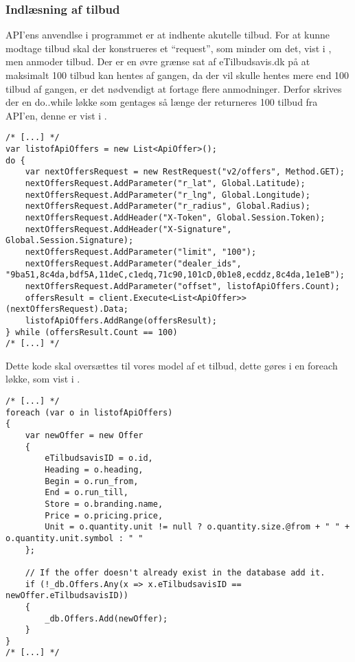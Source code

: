 \subsubsection{Indlæsning af tilbud}
API'ens anvendlse i programmet er at indhente akutelle tilbud.
For at kunne modtage tilbud skal der konstrueres et ``request'', som minder om det, vist i , men anmoder tilbud.
Der er en øvre grænse sat af eTilbudsavis.dk på at maksimalt 100 tilbud kan hentes af gangen, da der vil skulle hentes mere end 100 tilbud af gangen, er det nødvendigt at fortage flere anmodninger.
Derfor skrives der en do..while løkke som gentages så længe der returneres 100 tilbud fra API'en, denne er vist i .

\begin{lstlisting}[caption="C\#-kode som anvender ``/v2/offers'' delen af API'en til at hente tilbud.", label=apiofferscs]
/* [...] */
var listofApiOffers = new List<ApiOffer>();
do {
    var nextOffersRequest = new RestRequest("v2/offers", Method.GET);
    nextOffersRequest.AddParameter("r_lat", Global.Latitude);
    nextOffersRequest.AddParameter("r_lng", Global.Longitude);
    nextOffersRequest.AddParameter("r_radius", Global.Radius);
    nextOffersRequest.AddHeader("X-Token", Global.Session.Token);
    nextOffersRequest.AddHeader("X-Signature", Global.Session.Signature);
    nextOffersRequest.AddParameter("limit", "100");
    nextOffersRequest.AddParameter("dealer_ids", "9ba51,8c4da,bdf5A,11deC,c1edq,71c90,101cD,0b1e8,ecddz,8c4da,1e1eB");
    nextOffersRequest.AddParameter("offset", listofApiOffers.Count);
    offersResult = client.Execute<List<ApiOffer>>(nextOffersRequest).Data;
    listofApiOffers.AddRange(offersResult);
} while (offersResult.Count == 100)
/* [...] */
\end{lstlisting}

Dette kode skal oversættes til vores model af et tilbud, dette gøres i en foreach løkke, som vist i .

\begin{lstlisting}[caption="C\#-kode som bruger API-data til at oprette instancer af Offer-klassen\, og tilføjer dem til databasen", label=apiofferstooffercs]
/* [...] */
foreach (var o in listofApiOffers)
{
    var newOffer = new Offer
    {
        eTilbudsavisID = o.id,
        Heading = o.heading,
        Begin = o.run_from,
        End = o.run_till,
        Store = o.branding.name,
        Price = o.pricing.price,
        Unit = o.quantity.unit != null ? o.quantity.size.@from + " " + o.quantity.unit.symbol : " "
    };

    // If the offer doesn't already exist in the database add it.
    if (!_db.Offers.Any(x => x.eTilbudsavisID == newOffer.eTilbudsavisID))
    {
        _db.Offers.Add(newOffer);
    }
}
/* [...] */
\end{lstlisting}

